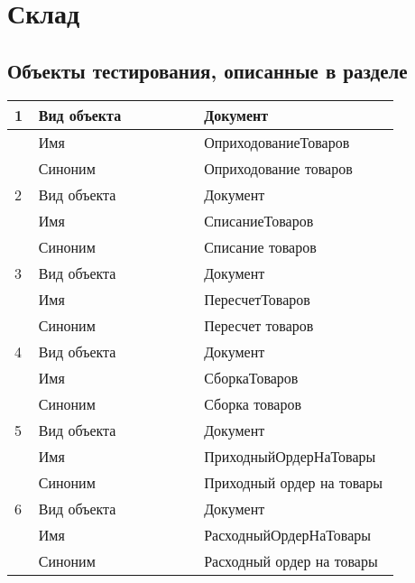 \section{Склад}
\subsection{Объекты тестирования, описанные в разделе}

\begin{longtable}{p{0.05\linewidth}p{0.4\linewidth}p{0.4\linewidth}}
    	\hline
    1 & Вид объекта & Документ \\
    \hline
    & Имя & ОприходованиеТоваров \\
     \hline
       & Синоним  & Оприходование товаров \\
    \hline
    2 & Вид объекта  & Документ \\
    \hline
    & Имя & СписаниеТоваров \\
    \hline
    & Синоним  & Списание товаров \\
    \hline
    3 & Вид объекта  & Документ \\
    \hline
    & Имя & ПересчетТоваров \\
    \hline
    & Синоним  & Пересчет товаров \\
    \hline
    4 & Вид объекта  & Документ \\
   \hline
   & Имя & СборкаТоваров \\
   \hline
   & Синоним  & Сборка товаров \\
   \hline
   5 & Вид объекта  & Документ \\
   \hline
   & Имя & ПриходныйОрдерНаТовары \\
   \hline
   & Синоним  & Приходный ордер на товары \\
   \hline
    6 & Вид объекта  & Документ \\
   \hline
   & Имя & РасходныйОрдерНаТовары \\
   \hline
   & Синоним  & Расходный ордер на товары \\
   \hline

    \bottomrule %
\end{longtable}
